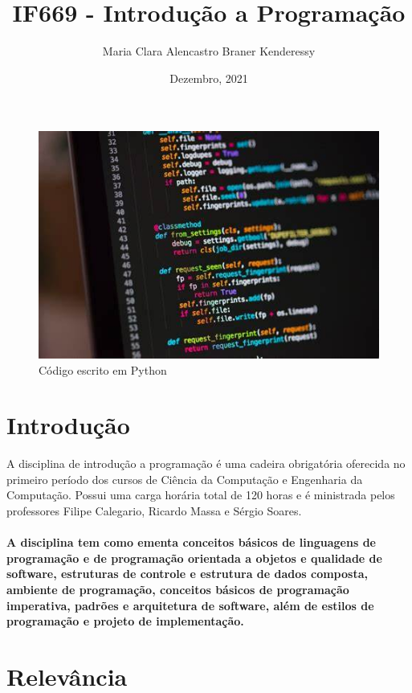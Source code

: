 \documentclass{article}
\title{IF669 - Introdução a Programação}
\author{Maria Clara Alencastro Braner Kenderessy}
\date{Dezembro, 2021}
\begin{document}
\maketitle

\begin{figure}[h]
    \centering
    \includegraphics[scale=0.6]{projetoic_img.jpg}
    \caption{Código escrito em Python}
    \label{fig:mesh1}
\end{figure}

\section{Introdução}

\hspace{0.5in}A disciplina de introdução a programação é uma cadeira obrigatória oferecida no primeiro período dos cursos de Ciência da Computação e Engenharia da Computação. Possui uma carga horária total de 120 horas e é ministrada pelos professores Filipe Calegario, Ricardo Massa e Sérgio Soares.

\paragraph{\hspace{0.5in}A disciplina tem como ementa conceitos básicos de linguagens de programação e de programação orientada a objetos e qualidade de software, estruturas de controle e estrutura de dados composta, ambiente de programação, conceitos básicos de programação imperativa, padrões e arquitetura de software, além de estilos de programação e projeto de implementação.}

\section{Relevância}
\end{document}
